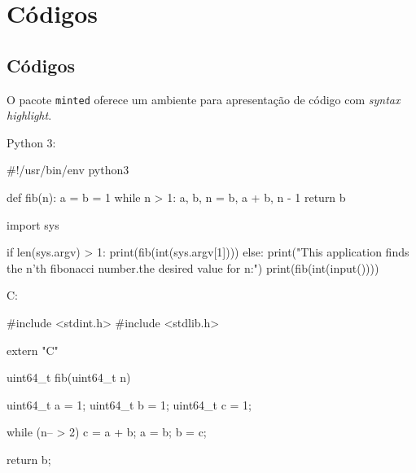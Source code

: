
\chapter{Códigos}
\section{Códigos}

O pacote \texttt{minted} oferece um ambiente para apresentação de código com
\textit{syntax highlight}.

Python 3:

\begin{python3code}
#!/usr/bin/env python3


def fib(n):
    a = b = 1
    while n > 1:
        a, b, n = b, a + b, n - 1
    return b

import sys

if len(sys.argv) > 1:
    print(fib(int(sys.argv[1])))
else:
    print("This application finds the n'th fibonacci number.\nType the desired value for n:")
    print(fib(int(input())))
\end{python3code}
%
\label{code:python-code}

C:

\begin{ccode}
#include <stdint.h>
#include <stdlib.h>

extern "C" {
    uint64_t fib(uint64_t n)
    {
        uint64_t a = 1;
        uint64_t b = 1;
        uint64_t c = 1;

        while (n-- > 2) {
            c = a + b;
            a = b;
            b = c;
        }

        return b;
    }
}
\end{ccode}
%
\label{code:c-code}
